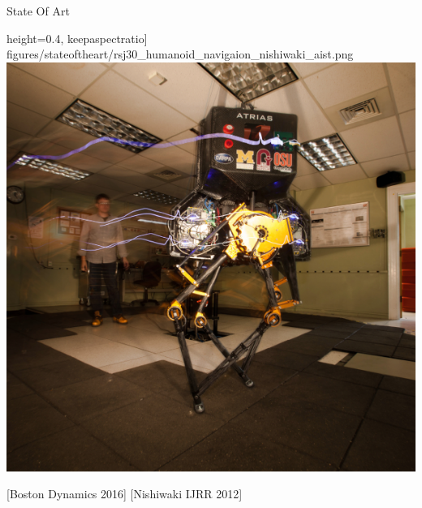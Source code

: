 \begin{frame}{State Of Art}
\begin{center}
height=0.4\textheight , keepaspectratio]
{figures/stateoftheart/rsj30_humanoid_navigaion_nishiwaki_aist.png}
\hspace*{0.3cm}
\includegraphics[trim={1.5cm 0.0cm 1.0cm 0.0cm}, clip,
height=0.4\textheight , keepaspectratio]
{figures/stateoftheart/what-is-atrias.png}
\end{center}
[Boston Dynamics 2016] \hspace*{1.7cm} [Nishiwaki IJRR 2012]

\end{frame}